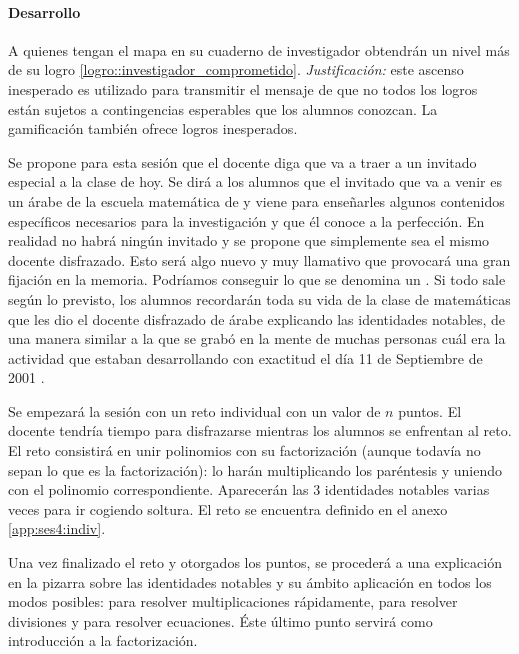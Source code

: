 \paragraph{Desarrollo}

A quienes tengan el mapa en su cuaderno de investigador obtendrán un nivel más de su logro \ref{logro::investigador_comprometido}.
%
\textit{Justificación:} este ascenso inesperado es utilizado para transmitir el mensaje de que no todos los logros están sujetos a contingencias esperables que los alumnos conozcan.
%
La gamificación también ofrece logros inesperados.
%

Se propone para esta sesión que el docente diga que va a traer a un invitado especial a la clase de hoy.
%
Se dirá a los alumnos que el invitado que va a venir es un árabe de la escuela matemática de \arab y viene para enseñarles algunos contenidos específicos necesarios para la investigación y que él conoce a la perfección.
%
En realidad no habrá ningún invitado y se propone que simplemente sea el mismo docente disfrazado.
%
Esto será algo nuevo y muy llamativo que provocará una gran fijación en la memoria.
%
Podríamos conseguir lo que se denomina un .
Si todo sale según lo previsto, los alumnos recordarán toda su vida de la clase de matemáticas que les dio el docente disfrazado de árabe explicando las identidades notables, 
%
de una manera similar a la que se grabó en la mente de muchas personas cuál era la actividad que estaban desarrollando con exactitud el día 11 de Septiembre de 2001 \citep{11s}.

Se empezará la sesión con un reto individual con un valor de $n$ puntos.
%
El docente tendría tiempo para disfrazarse mientras los alumnos se enfrentan al reto.
%
El reto consistirá en unir polinomios con su factorización (aunque todavía no sepan lo que es la factorización): lo harán multiplicando los paréntesis y uniendo con el polinomio correspondiente.
%
Aparecerán las 3 identidades notables varias veces para ir cogiendo soltura.
%
El reto se encuentra definido en el anexo \ref{app:ses4:indiv}.

Una vez finalizado el reto y otorgados los puntos, se procederá a una explicación en la pizarra sobre las identidades notables y su ámbito aplicación en todos los modos posibles:
%
para resolver multiplicaciones rápidamente, para resolver divisiones y para resolver ecuaciones.
%
Éste último punto servirá como introducción a la factorización.



